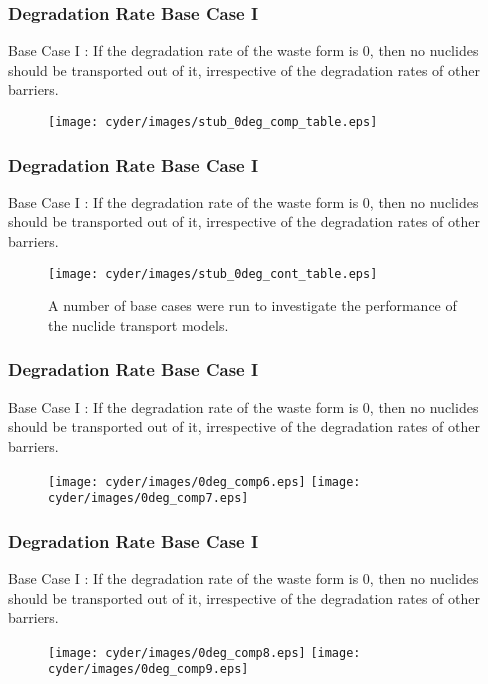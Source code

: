 \begin{frame}
  \frametitle{Degradation Rate Base Case I}
  Base Case I : If the degradation rate of the waste form is 0, then no nuclides should be 
  transported out of it, irrespective of the degradation rates of other 
  barriers. 

  \begin{figure}[htbp!]
    \begin{center}
      \texttt{[image: cyder/images/stub\_0deg\_comp\_table.eps]}
    \end{center}
  \end{figure}
\end{frame}

\begin{frame}
  \frametitle{Degradation Rate Base Case I}
  Base Case I : If the degradation rate of the waste form is 0, then no nuclides should be 
  transported out of it, irrespective of the degradation rates of other 
  barriers. 

  \begin{figure}[htbp!]
    \begin{center}
      \texttt{[image: cyder/images/stub\_0deg\_cont\_table.eps]}
      \caption{A number of base cases were run to investigate the performance of 
      the nuclide transport models.}
    \end{center}
  \end{figure}
\end{frame}

\begin{frame}
  \frametitle{Degradation Rate Base Case I}
  Base Case I : If the degradation rate of the waste form is 0, then no nuclides should be 
  transported out of it, irrespective of the degradation rates of other 
  barriers. 

  \begin{figure}[htbp!]
    \begin{center}
      \texttt{[image: cyder/images/0deg\_comp6.eps]}
      \texttt{[image: cyder/images/0deg\_comp7.eps]}
    \end{center}
  \end{figure}
\end{frame}

\begin{frame}
  \frametitle{Degradation Rate Base Case I}
  Base Case I : If the degradation rate of the waste form is 0, then no nuclides should be 
  transported out of it, irrespective of the degradation rates of other 
  barriers. 

  \begin{figure}[htbp!]
    \begin{center}
      \texttt{[image: cyder/images/0deg\_comp8.eps]}
      \texttt{[image: cyder/images/0deg\_comp9.eps]}
    \end{center}
  \end{figure}
\end{frame}

